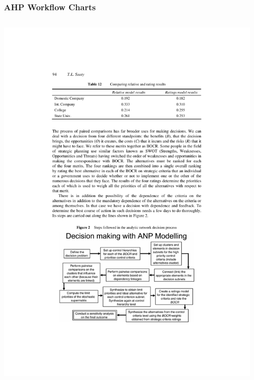 \documentclass[10pt,handout,hyperref={colorlinks=true,linkcolor=blue,citecolor=citelink,urlcolor=gray}]{beamer}
\newcounter{e_temp}
\begin{document}
\begin{frame}[label=FlowChart]
\frametitle{AHP Workflow Charts}
{\scriptsize
\begin{columns}[c]
      \begin{column}{0.45\textwidth}
	\centerline{\includegraphics[width=1.1\textwidth]{AHPWorkflow}}
	\vspace{4ex}
	

\end{column}
\end{columns}}
\end{frame}
\end{document}
